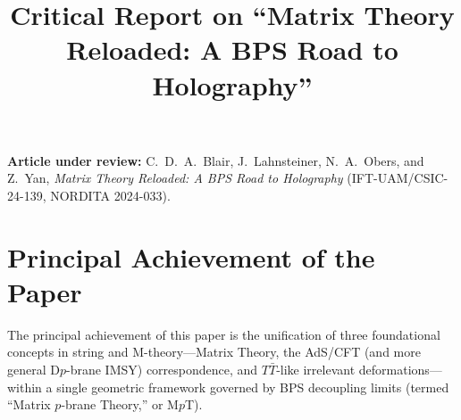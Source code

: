 \documentclass[11pt,a4paper]{article}
\title{\textbf{Critical Report on ``Matrix Theory Reloaded: A BPS Road to Holography''}}
\author{}
\date{}
\begin{document}
\maketitle
\vspace{-2em}

\noindent\textbf{Article under review:} C.~D.~A.~Blair, J.~Lahnsteiner, N.~A.~Obers, and Z.~Yan, \emph{Matrix Theory Reloaded: A BPS Road to Holography} (IFT-UAM/CSIC-24-139, NORDITA 2024-033).

\section{Principal Achievement of the Paper}

The principal achievement of this paper is the unification of three foundational concepts in string and M-theory---Matrix Theory, the AdS/CFT (and more general D$p$-brane IMSY) correspondence, and $T\bar{T}$-like irrelevant deformations---within a single geometric framework governed by BPS decoupling limits (termed ``Matrix $p$-brane Theory,'' or M$p$T). 
\end{document}

